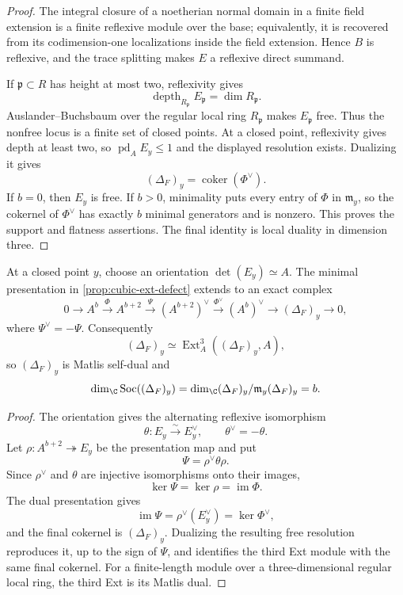 \begin{proof}
The integral closure of a noetherian normal domain in a finite field extension
is a finite reflexive module over the base; equivalently, it is recovered from
its codimension-one localizations inside the field extension.  Hence \(B\) is
reflexive, and the trace splitting makes \(E\) a reflexive direct summand.

If \(\mathfrak p\subset R\) has height at most two, reflexivity gives
\[
\operatorname{depth}_{R_\mathfrak p}E_\mathfrak p
 =\dim R_\mathfrak p.
\]
Auslander--Buchsbaum over the regular local ring \(R_\mathfrak p\) makes
\(E_\mathfrak p\) free.  Thus the nonfree locus is a finite set of closed
points.  At a closed point, reflexivity gives depth at least two, so
\(\operatorname{pd}_A E_y\le1\) and the displayed resolution exists.
Dualizing it gives
\[
(\Delta_F)_y=\operatorname{coker}(\Phi^\vee).
\]
If \(b=0\), then \(E_y\) is free.  If \(b>0\), minimality puts every entry of
\(\Phi\) in \(\mathfrak m_y\), so the cokernel of \(\Phi^\vee\) has exactly
\(b\) minimal generators and is nonzero.  This proves the support and
flatness assertions.  The final identity is local duality in dimension three.
\end{proof}

\begin{proposition}
\label{prop:cubic-defect-self-duality}
At a closed point \(y\), choose an orientation \(\det(E_y)\simeq A\).  The
minimal presentation in \cref{prop:cubic-ext-defect} extends to an exact
complex
\[
0\longrightarrow A^b\xrightarrow{\Phi}A^{b+2}
 \xrightarrow{\Psi}(A^{b+2})^\vee
 \xrightarrow{\Phi^\vee}(A^b)^\vee
 \longrightarrow(\Delta_F)_y\longrightarrow0,
\]
where \(\Psi^\vee=-\Psi\).  Consequently
\[
(\Delta_F)_y\simeq
\operatorname{Ext}^3_A((\Delta_F)_y,A),
\]
so \((\Delta_F)_y\) is Matlis self-dual and
\[
\dim_\C\operatorname{Soc}((\Delta_F)_y)
 =\dim_\C (\Delta_F)_y/\mathfrak m_y(\Delta_F)_y=b.
\]
\end{proposition}

\begin{proof}
The orientation gives the alternating reflexive isomorphism
\[
\theta\colon E_y\xrightarrow{\sim}E_y^\vee,
\qquad \theta^\vee=-\theta.
\]
Let \(\rho\colon A^{b+2}\twoheadrightarrow E_y\) be the presentation map and
put
\[
\Psi=\rho^\vee\theta\rho.
\]
Since \(\rho^\vee\) and \(\theta\) are injective isomorphisms onto their
images,
\[
\ker\Psi=\ker\rho=\operatorname{im}\Phi.
\]
The dual presentation gives
\[
\operatorname{im}\Psi=\rho^\vee(E_y^\vee)=\ker\Phi^\vee,
\]
and the final cokernel is \((\Delta_F)_y\).  Dualizing the resulting free
resolution reproduces it, up to the sign of \(\Psi\), and identifies the third
Ext module with the same final cokernel.  For a finite-length module over a
three-dimensional regular local ring, the third Ext is its Matlis dual.
\end{proof}

